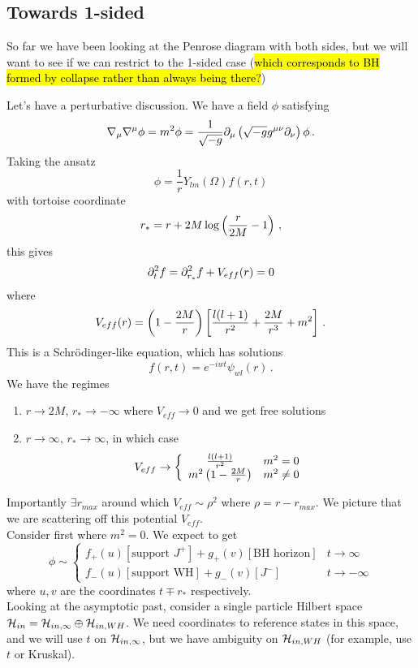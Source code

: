 \documentclass{article}
\begin{document}
\subsection{Towards 1-sided}
So far we have been looking at the Penrose diagram with both sides, but we will want to see if we can restrict to the 1-sided case (\hl{which corresponds to BH formed by collapse rather than always being there?})

Let's have a perturbative discussion. We have a field $\phi$ satisfying 
\[
\nabla_\mu \nabla^\mu \phi = m^2 \phi = \frac{1}{\sqrt{-g}} \partial_\mu \left( \sqrt{-g} g^{\mu\nu} \partial_\nu \right) \phi \, .
\]
Taking the ansatz
\[
\phi = \frac{1}{r} Y_{lm}(\Omega) f(r,t)
\]
with tortoise coordinate 
\[
r_\ast = r+2M \log\left( \frac{r}{2M}-1 \right) \, ,
\]
this gives 
\[
\partial_t^2 f = \partial_{r_\ast}^2 f + V_{eff}(r) = 0
\]
where 
\[
V_{eff}(r) = \left( 1- \frac{2M}{r} \right) \left[ \frac{l(l+1)}{r^2} + \frac{2M}{r^3} + m^2  \right] \, .
\]
This is a Schr\"odinger-like equation, which has solutions 
\[
f(r,t) = e^{-iwt} \psi_{wl}(r) \, .
\]
We have the regimes 
\begin{enumerate}
	\item $r \to 2M, \, r_\ast \to -\infty$ where $V_{eff} \to 0$ and we get free solutions
	\item $r \to \infty, \, r_\ast \to \infty$, in which case 
	\[
	V_{eff} \to \left \lbrace \begin{array}{cc}
	\frac{l(l+1)}{r^2} & m^2=0 \\ m^2 \left( 1-\frac{2M}{r} \right) & m^2 \neq 0 
	\end{array} \right .
	\]
\end{enumerate}
Importantly $\exists r_{max}$ around which $V_{eff} \sim \rho^2$ where $\rho = r-r_{max}$. We picture that we are scattering off this potential $V_{eff}$. \\
Consider first where $m^2=0$. We expect to get 
\[
\phi \sim \left \lbrace \begin{array}{cc}
f_+(u) [\text{support } J^+] + g_+(v) [\text{BH horizon}] & t \to \infty \\
f_-(u) [\text{support WH}] + g_-(v) [J^-] & t \to -\infty 
\end{array}\right. 
\]
where $u,v$ are the coordinates $t \mp r_\ast$ respectively. \\
Looking at the asymptotic past, consider a single particle Hilbert space $\mathcal{H}_{in} = \mathcal{H}_{in, \infty} \oplus \mathcal{H}_{in, WH}$. We need coordinates to reference states in this space, and we will use $t$ on $\mathcal{H}_{in, \infty}$, but we have ambiguity on $\mathcal{H}_{in, WH}$ (for example, use $t$ or Kruskal). \\
\end{document}
